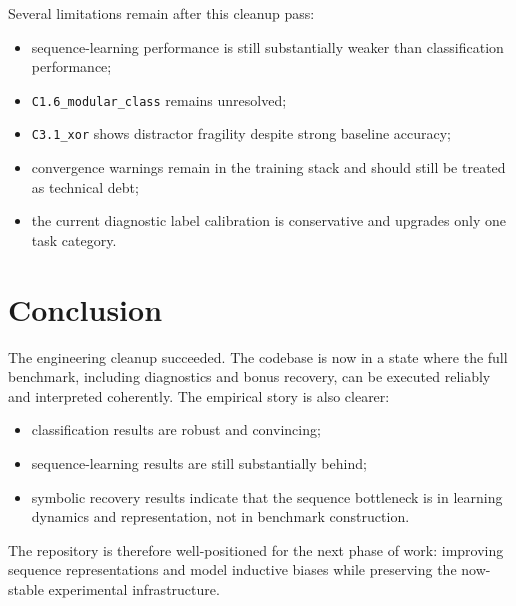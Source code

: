 \documentclass[11pt]{article}
\begin{document}
Several limitations remain after this cleanup pass:

\begin{itemize}
  \item sequence-learning performance is still substantially weaker than classification performance;
  \item \texttt{C1.6\_modular\_class} remains unresolved;
  \item \texttt{C3.1\_xor} shows distractor fragility despite strong baseline accuracy;
  \item convergence warnings remain in the training stack and should still be treated as technical debt;
  \item the current diagnostic label calibration is conservative and upgrades only one task category.
\end{itemize}

\section{Conclusion}

The engineering cleanup succeeded. The codebase is now in a state where the full benchmark, including diagnostics and bonus recovery, can be executed reliably and interpreted coherently. The empirical story is also clearer:

\begin{itemize}
  \item classification results are robust and convincing;
  \item sequence-learning results are still substantially behind;
  \item symbolic recovery results indicate that the sequence bottleneck is in learning dynamics and representation, not in benchmark construction.
\end{itemize}

The repository is therefore well-positioned for the next phase of work: improving sequence representations and model inductive biases while preserving the now-stable experimental infrastructure.
\end{document}
